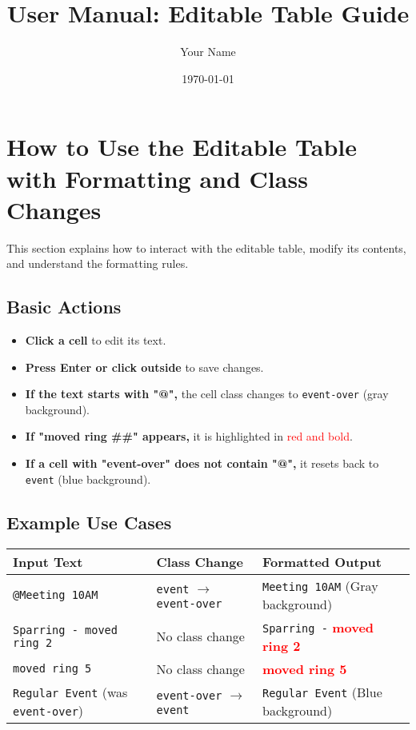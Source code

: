 \documentclass[a4paper,12pt]{article}
\title{User Manual: Editable Table Guide}
\author{Your Name}
\date{\today}
\begin{document}
\maketitle

\section{How to Use the Editable Table with Formatting and Class Changes}

This section explains how to interact with the editable table, modify its contents, and understand the formatting rules.

\subsection{Basic Actions}
\begin{itemize}
    \item \textbf{Click a cell} to edit its text.
    \item \textbf{Press Enter or click outside} to save changes.
    \item \textbf{If the text starts with "@",} the cell class changes to \texttt{event-over} (gray background).
    \item \textbf{If "moved ring \#\#" appears,} it is highlighted in \textcolor{red}{red and bold}.
    \item \textbf{If a cell with "event-over" does not contain "@",} it resets back to \texttt{event} (blue background).
\end{itemize}

\subsection{Example Use Cases}
\begin{longtable}{|p{4cm}|p{4cm}|p{6cm}|}
\hline
\textbf{Input Text} & \textbf{Class Change} & \textbf{Formatted Output} \\ \hline
\texttt{@Meeting 10AM} & \texttt{event} $\rightarrow$ \texttt{event-over} & \texttt{Meeting 10AM} (Gray background) \\ \hline
\texttt{Sparring - moved ring 2} & No class change & \texttt{Sparring -} \textbf{\textcolor{red}{moved ring 2}} \\ \hline
\texttt{moved ring 5} & No class change & \textbf{\textcolor{red}{moved ring 5}} \\ \hline
\texttt{Regular Event} (was \texttt{event-over}) & \texttt{event-over} $\rightarrow$ \texttt{event} & \texttt{Regular Event} (Blue background) \\ \hline
\end{longtable}
\end{document}
